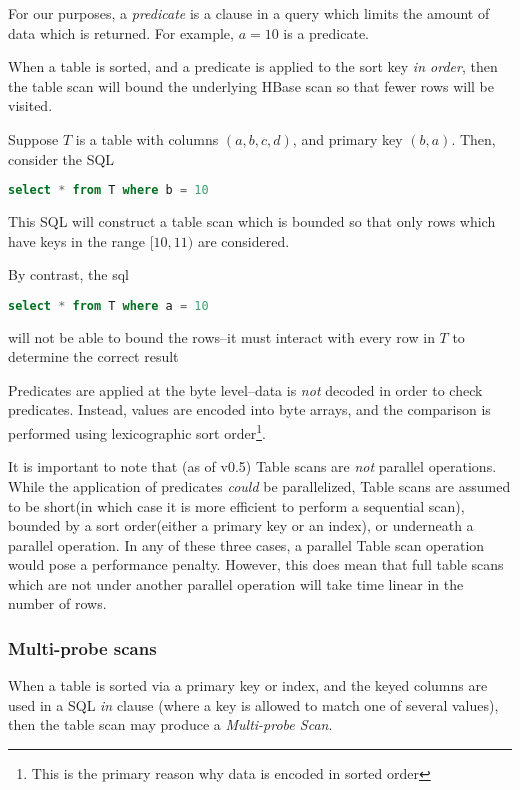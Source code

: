 For our purposes, a \emph{predicate} is a clause in a query which limits the amount of data which is returned. For example, $a=10$ is a predicate.

When a table is sorted, and a predicate is applied to the sort key \emph{in order}, then the table scan will bound the underlying HBase scan so that fewer rows will be visited. 

\begin{exmp}
Suppose $T$ is a table with columns $(a,b,c,d)$, and primary key $(b,a)$. Then, consider the SQL

\begin{lstlisting}[frame=single,captionpos=b,caption=SQL for bounded scan,language=SQL]
	select * from T where b = 10 
\end{lstlisting}

				This SQL will construct a table scan which is bounded so that only rows which have keys in the range $[10,11)$ are considered.

				By contrast, the sql

\begin{lstlisting}[frame=single,captionpos=b,caption=SQL for unbounded scan,language=SQL]
	select * from T where a = 10 
\end{lstlisting}
				will not be able to bound the rows--it must interact with every row in $T$ to determine the correct result
\end{exmp}

Predicates are applied at the byte level--data is \emph{not} decoded in order to check predicates. Instead, values are encoded into byte arrays, and the comparison is performed using lexicographic sort order\footnote{This is the primary reason why data is encoded in sorted order}.

It is important to note that (as of v0.5) Table scans are \emph{not} parallel operations. While the application of predicates \emph{could} be parallelized, Table scans are assumed to be short(in which case it is more efficient to perform a sequential scan), bounded by a sort order(either a primary key or an index), or underneath a parallel operation. In any of these three cases, a parallel Table scan operation would pose a performance penalty. However, this does mean that full table scans which are not under another parallel operation will take time linear in the number of rows. 

\subsubsection{Multi-probe scans}
When a table is sorted via a primary key or index, and the keyed columns are used in a SQL \emph{in} clause (where a key is allowed to match one of several values), then the table scan may produce a \emph{Multi-probe Scan}.

